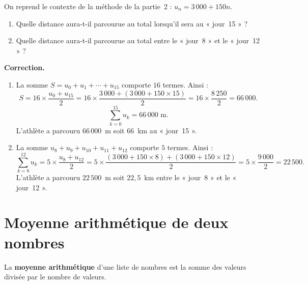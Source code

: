 \documentclass[10pt,a4paper]{article}
\newenvironment{correction}{\par\medskip\noindent\textbf{Correction.} }{\par\medskip}
\begin{document}
\begin{meth}

	On reprend le contexte de la méthode de la partie~2 : $u_n = 3\,000 + 150n$.

	\begin{enumerate}
		\item[a)] Quelle distance aura-t-il parcourue au total lorsqu'il sera au « jour~15 » ?
		\item[b)] Quelle distance aura-t-il parcourue au total entre le « jour~8 » et le « jour~12 » ?
	\end{enumerate}

	\begin{correction}
		\begin{enumerate}
			\item[a)] La somme $S = u_0 + u_1 + \cdots + u_{15}$ comporte $16$ termes. Ainsi :
			      $$
				      S = 16 \times \frac{u_0 + u_{15}}{2} = 16 \times \frac{3\,000 + (3\,000 + 150 \times 15)}{2}
				      = 16 \times \frac{8\,250}{2} = 66\,000.
			      $$
			      $$
				      \sum_{k=0}^{15} u_k = 66\,000 \text{ m}.
			      $$
			      L'athlète a parcouru $66\,000$~m soit $66$~km au « jour~15 ».

			\item[b)] La somme $u_8 + u_9 + u_{10} + u_{11} + u_{12}$ comporte $5$ termes. Ainsi :
			      $$
				      \sum_{k=8}^{12} u_k = 5 \times \frac{u_8 + u_{12}}{2}
				      = 5 \times \frac{(3\,000 + 150 \times 8) + (3\,000 + 150 \times 12)}{2}
				      = 5 \times \frac{9\,000}{2} = 22\,500.
			      $$
			      L'athlète a parcouru $22\,500$~m soit $22{,}5$~km entre le « jour~8 » et le « jour~12 ».
		\end{enumerate}
	\end{correction}
\end{meth}

\section{Moyenne arithmétique de deux nombres}

\begin{defi}
	La \textbf{moyenne arithmétique} d'une liste de nombres est la somme des valeurs divisée par le nombre de valeurs.
\end{defi}
\end{document}
